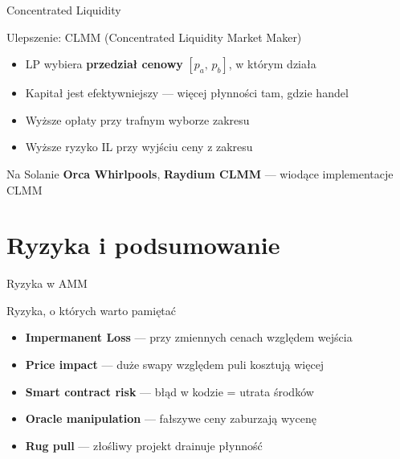 \begin{frame}{Concentrated Liquidity}
  \begin{block}{Ulepszenie: CLMM (Concentrated Liquidity Market Maker)}
    \begin{itemize}
      \item LP wybiera \textbf{przedział cenowy} $[p_a,\, p_b]$, w którym działa
      \item Kapitał jest efektywniejszy --- więcej płynności tam, gdzie handel
      \item Wyższe opłaty przy trafnym wyborze zakresu
      \item Wyższe ryzyko IL przy wyjściu ceny z zakresu
    \end{itemize}
  \end{block}
  \vspace{0.3cm}
  \begin{exampleblock}{Na Solanie}
    \textbf{Orca Whirlpools}, \textbf{Raydium CLMM} --- wiodące implementacje CLMM
  \end{exampleblock}
\end{frame}

\section{Ryzyka i podsumowanie}

\begin{frame}{Ryzyka w AMM}
  \begin{alertblock}{Ryzyka, o których warto pamiętać}
    \begin{itemize}
      \item \textbf{Impermanent Loss} --- przy zmiennych cenach względem wejścia
      \item \textbf{Price impact} --- duże swapy względem puli kosztują więcej
      \item \textbf{Smart contract risk} --- błąd w kodzie = utrata środków
      \item \textbf{Oracle manipulation} --- fałszywe ceny zaburzają wycenę
      \item \textbf{Rug pull} --- złośliwy projekt drainuje płynność
    \end{itemize}
  \end{alertblock}
\end{frame}

